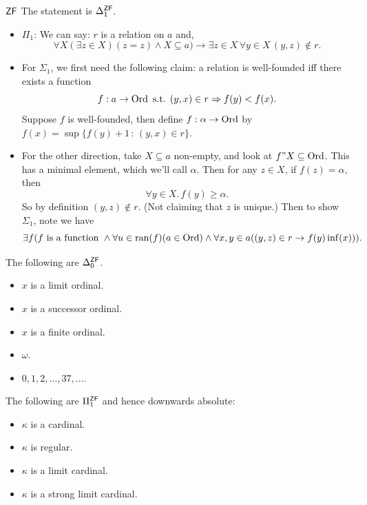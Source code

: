 \documentclass{article}
\begin{document}
\begin{fancylem}{$\mathsf{ZF}$}
    The statement  is $\Delta_{1}^{\mathsf{ZF}}$.
\end{fancylem}
\proof \begin{itemize}
    \item $\Pi_{1}$: We can say: $r$ is a relation on $a$ and, \[ \forall X (\exists z \in X)(z=z) \wedge X \subseteq a) \rightarrow \exists z \in X \, \forall y \in X \, (y,z) \notin r.\]
    \item For $\Sigma_{1}$, we first need the following claim: a relation is well-founded iff there exists a function \[ f: a \to \operatorname{Ord} \text{ s.t. } (y,x) \in r \Rightarrow f(y) < f(x).\]
          Suppose $f$ is well-founded, then define $f: \alpha \to \operatorname{Ord}$ by $f(x)= \sup\{f(y)+1 \, : \, (y,x) \in r\}$.
    \item For the other direction, take $X \subseteq a$ non-empty, and look at $f"X \subseteq \operatorname{Ord}$. This has a minimal element, which we'll call $\alpha$. Then for any $z \in X$, if $f(z)= \alpha$, then \[ \forall y \in X.\, f(y) \geq \alpha.\] So by definition $(y,z) \notin r$. (Not claiming that $z$ is unique.)\gap
          Then to show $\Sigma_{1}$, note we have \[ \exists f (f \text{ is a function } \wedge \forall u \in \operatorname{ran}(f) (a \in \operatorname{Ord}) \wedge \forall x,y \in a ( (y,z) \in r \rightarrow f(y) \inf(x))).\]
\end{itemize}
\endproof
\begin{fancyprop}{}
    The following are $\Delta_{0}^{\mathsf{ZF}}$.
    \begin{itemize}
        \item $x$ is a limit ordinal.
        \item $x$ is a successor ordinal.
        \item $x$ is a finite ordinal.
        \item $\omega$.
        \item $0,1,2,\dots,37,\dots$.
    \end{itemize}
\end{fancyprop}
\endproof
\begin{fancyprop}{}
    The following are $\Pi_{1}^{\mathsf{ZF}}$ and hence downwards absolute: \begin{itemize}
        \item $\kappa$ is a cardinal.
        \item $\kappa$ is regular.
        \item $\kappa$ is a limit cardinal.
        \item $\kappa$ is a strong limit cardinal.
    \end{itemize}
\end{fancyprop}
\endproof
\end{document}
